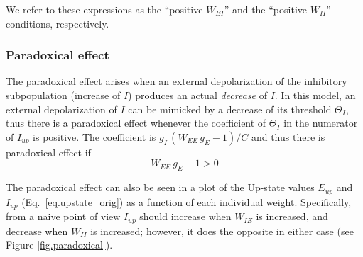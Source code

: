 \documentclass[twocolumn]{article}
\newcommand{\EE}{\mathit{EE}}
\newcommand{\EI}{\mathit{EI}}
\newcommand{\IE}{\mathit{IE}}
\newcommand{\II}{\mathit{II}}
\newcommand{\up}{\mathit{up}}
\begin{document}
\noindent We refer to these expressions as the ``positive $W_{\EI}$'' and the ``positive $W_{\II}$'' conditions, respectively.



\subsubsection{Paradoxical effect}

The paradoxical effect arises when an external depolarization of the inhibitory subpopulation (increase of $I$) produces an actual {\em decrease} of $I$. In this model, an external depolarization of $I$ can be mimicked by a decrease of its threshold $\Theta_I$, thus there is a paradoxical effect whenever the coefficient of $\Theta_I$ in the numerator of $I_{up}$ is positive. The coefficient is $g_I \, (W_{\EE} \, g_E - 1)/C$ and thus there is paradoxical effect if
\begin{equation}
W_{\EE} \, g_E - 1 >0
\label{eq.paradoxical}
\end{equation}

The paradoxical effect can also be seen in a plot of the Up-state values $E_{\up}$ and $I_{\up}$ (Eq.\ \ref{eq.upstate_orig}) as a function of each individual weight. Specifically, from a naive point of view $I_{\up}$ should increase when $W_{\IE}$ is increased, and decrease when $W_{\II}$ is increased; however, it does the opposite in either case (see Figure \ref{fig.paradoxical}).
\end{document}

